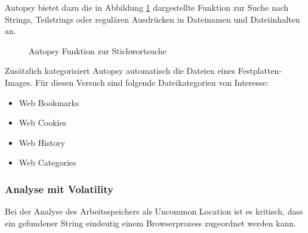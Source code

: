 Autopsy bietet dazu die in Abbildung \ref{img:autopsy-keywordsuche} dargestellte Funktion zur Suche nach Strings, Teilstrings oder regulären Ausdrücken in Dateinamen und Dateiinhalten an.
\begin{figure}[h!]
	\centerline{}
	\label{img:autopsy-keywordsuche}
	\caption{Autopsy Funktion zur Stichwortsuche}
\end{figure}

Zusätzlich kategorisiert Autopsy automatisch die Dateien eines Festplatten-Images. Für diesen Versuch sind folgende Dateikategorien von Interesse:
\begin{itemize}
\item Web Bookmarks
\item Web Cookies
\item Web History
\item Web Categories
\end{itemize}

\subsubsection*{Analyse mit Volatility}
\label{subsubsection:methodik-datenanalyse-uncommonlocations-analysemitvolatility}
Bei der Analyse des Arbeitsspeichers als Uncommon Location ist es kritisch, dass ein gefundener String eindeutig einem Browserprozess zugeordnet werden kann. 

